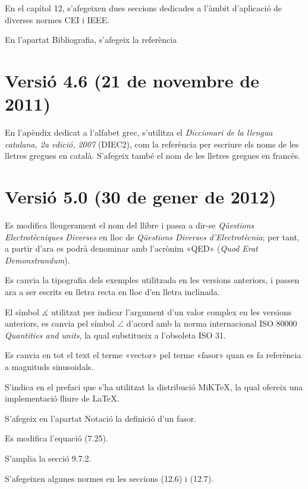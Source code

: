 En el capítol 12, s'afegeixen dues seccions dedicades a l'àmbit d'aplicació de diverses normes CEI i IEEE.

En l'apartat Bibliografia, s'afegeix la referència \cite{RJB}


\section*{Versió 4.6 (21 de novembre de 2011)}

En l'apèndix dedicat a l'alfabet grec, s'utilitza el \textit{Diccionari de la llengua catalana, 2a edició, 2007} (DIEC2), com la referència per escriure els noms de les lletres gregues en català. S'afegeix també el nom de les lletres gregues en francès.


\section*{Versió 5.0 (30 de gener de 2012)}

Es modifica lleugerament el nom del llibre i  passa a dir-se \textit{Qüestions Electrotècniques Diverses} en lloc de \textit{Qüestions Diverses d'Electrotècnia}; per tant, a partir d'ara es podrà denominar amb l'acrònim «QED» (\emph{Quod Erat Demonstrandum}).

Es canvia la tipografia dels exemples utilitzada en les versions anteriors, i passen ara a ser escrits en lletra recta en lloc d'en lletra inclinada.

El símbol $\measuredangle$ utilitzat per indicar l'argument d'un valor complex en les versions anteriors, es canvia pel símbol $\angle$ d'acord amb la norma internacional ISO 80000 \textit{Quantities and units}, la qual substitueix a l'obsoleta ISO 31.

Es canvia en tot el text el terme «vector» pel terme «fasor» quan es fa referència a magnituds sinusoidals.

S'indica en el prefaci que s'ha utilitzat la distribució MiK\TeX, la qual ofereix una implementació lliure de \LaTeX.

S'afegeix en l'apartat Notació la definició d'un fasor.

Es modifica l'equació (7.25).

S'amplia la secció 9.7.2.

S'afegeixen algunes normes en les seccions (12.6) i (12.7).

